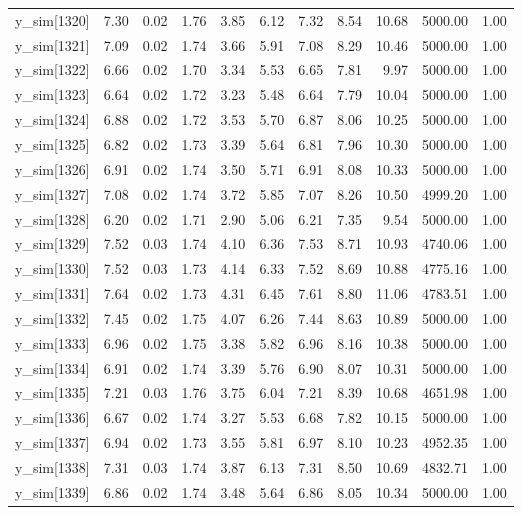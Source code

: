 \begin{table}[ht]
\begin{tabular}{rrrrrrrrrrr}
  y\_sim[1320] & 7.30 & 0.02 & 1.76 & 3.85 & 6.12 & 7.32 & 8.54 & 10.68 & 5000.00 & 1.00 \\ 
  y\_sim[1321] & 7.09 & 0.02 & 1.74 & 3.66 & 5.91 & 7.08 & 8.29 & 10.46 & 5000.00 & 1.00 \\ 
  y\_sim[1322] & 6.66 & 0.02 & 1.70 & 3.34 & 5.53 & 6.65 & 7.81 & 9.97 & 5000.00 & 1.00 \\ 
  y\_sim[1323] & 6.64 & 0.02 & 1.72 & 3.23 & 5.48 & 6.64 & 7.79 & 10.04 & 5000.00 & 1.00 \\ 
  y\_sim[1324] & 6.88 & 0.02 & 1.72 & 3.53 & 5.70 & 6.87 & 8.06 & 10.25 & 5000.00 & 1.00 \\ 
  y\_sim[1325] & 6.82 & 0.02 & 1.73 & 3.39 & 5.64 & 6.81 & 7.96 & 10.30 & 5000.00 & 1.00 \\ 
  y\_sim[1326] & 6.91 & 0.02 & 1.74 & 3.50 & 5.71 & 6.91 & 8.08 & 10.33 & 5000.00 & 1.00 \\ 
  y\_sim[1327] & 7.08 & 0.02 & 1.74 & 3.72 & 5.85 & 7.07 & 8.26 & 10.50 & 4999.20 & 1.00 \\ 
  y\_sim[1328] & 6.20 & 0.02 & 1.71 & 2.90 & 5.06 & 6.21 & 7.35 & 9.54 & 5000.00 & 1.00 \\ 
  y\_sim[1329] & 7.52 & 0.03 & 1.74 & 4.10 & 6.36 & 7.53 & 8.71 & 10.93 & 4740.06 & 1.00 \\ 
  y\_sim[1330] & 7.52 & 0.03 & 1.73 & 4.14 & 6.33 & 7.52 & 8.69 & 10.88 & 4775.16 & 1.00 \\ 
  y\_sim[1331] & 7.64 & 0.02 & 1.73 & 4.31 & 6.45 & 7.61 & 8.80 & 11.06 & 4783.51 & 1.00 \\ 
  y\_sim[1332] & 7.45 & 0.02 & 1.75 & 4.07 & 6.26 & 7.44 & 8.63 & 10.89 & 5000.00 & 1.00 \\ 
  y\_sim[1333] & 6.96 & 0.02 & 1.75 & 3.38 & 5.82 & 6.96 & 8.16 & 10.38 & 5000.00 & 1.00 \\ 
  y\_sim[1334] & 6.91 & 0.02 & 1.74 & 3.39 & 5.76 & 6.90 & 8.07 & 10.31 & 5000.00 & 1.00 \\ 
  y\_sim[1335] & 7.21 & 0.03 & 1.76 & 3.75 & 6.04 & 7.21 & 8.39 & 10.68 & 4651.98 & 1.00 \\ 
  y\_sim[1336] & 6.67 & 0.02 & 1.74 & 3.27 & 5.53 & 6.68 & 7.82 & 10.15 & 5000.00 & 1.00 \\ 
  y\_sim[1337] & 6.94 & 0.02 & 1.73 & 3.55 & 5.81 & 6.97 & 8.10 & 10.23 & 4952.35 & 1.00 \\ 
  y\_sim[1338] & 7.31 & 0.03 & 1.74 & 3.87 & 6.13 & 7.31 & 8.50 & 10.69 & 4832.71 & 1.00 \\ 
  y\_sim[1339] & 6.86 & 0.02 & 1.74 & 3.48 & 5.64 & 6.86 & 8.05 & 10.34 & 5000.00 & 1.00 \\ 

\end{tabular}
\end{table}
